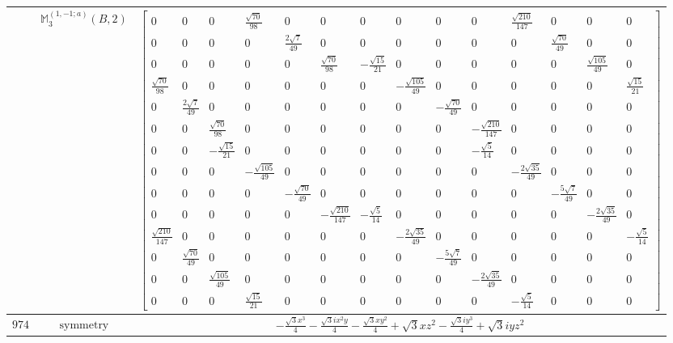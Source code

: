 \documentclass[fleqn,8pt,landscape]{jsarticle}
\begin{document}
\begin{longtable}{ccc}
$  $ & $ \mathbb{M}_{3}^{(1,-1;a)}(B,2) $ & $ \begin{bmatrix} 0 & 0 & 0 & \frac{\sqrt{70}}{98} & 0 & 0 & 0 & 0 & 0 & 0 & \frac{\sqrt{210}}{147} & 0 & 0 & 0 \\ 0 & 0 & 0 & 0 & \frac{2 \sqrt{7}}{49} & 0 & 0 & 0 & 0 & 0 & 0 & \frac{\sqrt{70}}{49} & 0 & 0 \\ 0 & 0 & 0 & 0 & 0 & \frac{\sqrt{70}}{98} & - \frac{\sqrt{15}}{21} & 0 & 0 & 0 & 0 & 0 & \frac{\sqrt{105}}{49} & 0 \\ \frac{\sqrt{70}}{98} & 0 & 0 & 0 & 0 & 0 & 0 & - \frac{\sqrt{105}}{49} & 0 & 0 & 0 & 0 & 0 & \frac{\sqrt{15}}{21} \\ 0 & \frac{2 \sqrt{7}}{49} & 0 & 0 & 0 & 0 & 0 & 0 & - \frac{\sqrt{70}}{49} & 0 & 0 & 0 & 0 & 0 \\ 0 & 0 & \frac{\sqrt{70}}{98} & 0 & 0 & 0 & 0 & 0 & 0 & - \frac{\sqrt{210}}{147} & 0 & 0 & 0 & 0 \\ 0 & 0 & - \frac{\sqrt{15}}{21} & 0 & 0 & 0 & 0 & 0 & 0 & - \frac{\sqrt{5}}{14} & 0 & 0 & 0 & 0 \\ 0 & 0 & 0 & - \frac{\sqrt{105}}{49} & 0 & 0 & 0 & 0 & 0 & 0 & - \frac{2 \sqrt{35}}{49} & 0 & 0 & 0 \\ 0 & 0 & 0 & 0 & - \frac{\sqrt{70}}{49} & 0 & 0 & 0 & 0 & 0 & 0 & - \frac{5 \sqrt{7}}{49} & 0 & 0 \\ 0 & 0 & 0 & 0 & 0 & - \frac{\sqrt{210}}{147} & - \frac{\sqrt{5}}{14} & 0 & 0 & 0 & 0 & 0 & - \frac{2 \sqrt{35}}{49} & 0 \\ \frac{\sqrt{210}}{147} & 0 & 0 & 0 & 0 & 0 & 0 & - \frac{2 \sqrt{35}}{49} & 0 & 0 & 0 & 0 & 0 & - \frac{\sqrt{5}}{14} \\ 0 & \frac{\sqrt{70}}{49} & 0 & 0 & 0 & 0 & 0 & 0 & - \frac{5 \sqrt{7}}{49} & 0 & 0 & 0 & 0 & 0 \\ 0 & 0 & \frac{\sqrt{105}}{49} & 0 & 0 & 0 & 0 & 0 & 0 & - \frac{2 \sqrt{35}}{49} & 0 & 0 & 0 & 0 \\ 0 & 0 & 0 & \frac{\sqrt{15}}{21} & 0 & 0 & 0 & 0 & 0 & 0 & - \frac{\sqrt{5}}{14} & 0 & 0 & 0 \end{bmatrix} $ \\ \hline
$ 974 $ & $ \text{symmetry} $ & $ - \frac{\sqrt{3} x^{3}}{4} - \frac{\sqrt{3} i x^{2} y}{4} - \frac{\sqrt{3} x y^{2}}{4} + \sqrt{3} x z^{2} - \frac{\sqrt{3} i y^{3}}{4} + \sqrt{3} i y z^{2} $ \\

\end{longtable}
\end{document}
